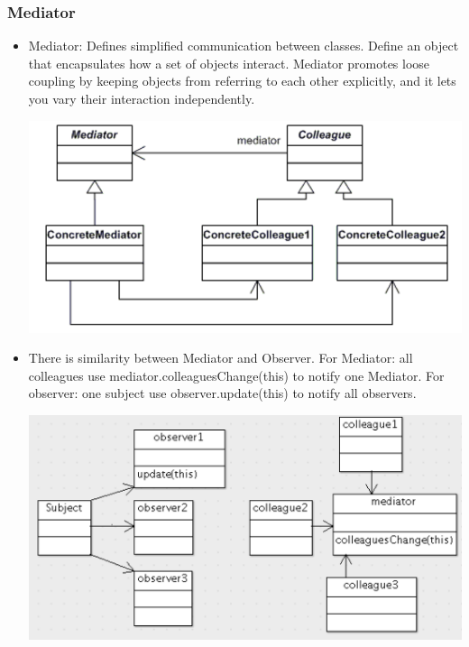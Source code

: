 \documentclass[a4paper,12pt,twoside]{book}
\begin{document}
\subsubsection{Mediator}
\begin{itemize}
\item Mediator: Defines simplified communication between classes. Define an object that encapsulates how a set of objects interact. Mediator promotes loose coupling by keeping objects from referring to each other explicitly, and it lets you vary their interaction independently.

\includegraphics[scale=0.75]{pics/mediator.png}

\item There is similarity between Mediator and Observer.  For Mediator: all colleagues use mediator.colleaguesChange(this) to notify one Mediator.  For observer: one subject use observer.update(this) to notify all observers.

\includegraphics[scale=0.6]{pics/om.png}
\end{itemize}
\end{document}
